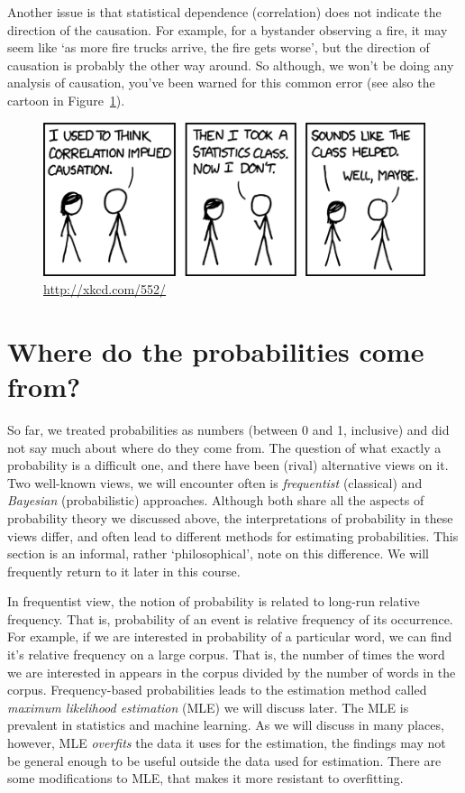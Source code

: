 Another issue is that statistical dependence (correlation)
does not indicate the direction of the causation.
For example,
for a bystander observing a fire,
it may seem like `as more fire trucks arrive, the fire gets worse',
but the direction of causation is probably the other way around.
So although,
we won't be doing any analysis of causation,
you've been warned for this common error
(see also the cartoon in Figure~\ref{fig:xkcd-correlation}).
\begin{figure}
  \includegraphics[width=\linewidth]{figures/xkcd-correlation}
  \caption{\url{http://xkcd.com/552/}}\label{fig:xkcd-correlation}%
\end{figure}



\section{Where do the probabilities come from?}

So far,
we treated probabilities as numbers (between 0 and 1, inclusive)
and did not say much about where do they come from.
The question of what exactly a probability is a difficult one, 
and there have been (rival) alternative views on it.
Two well-known views,
we will encounter often is \emph{frequentist} (classical)
and \emph{Bayesian} (probabilistic) approaches.
Although both share all the aspects of probability theory we discussed above,
the interpretations of probability in these views differ,
and often lead to different methods for estimating probabilities.
This section is an informal, rather `philosophical', note on this difference.
We will frequently return to it later in this course.

In frequentist view,
the notion of probability is related to long-run relative frequency.
That is,
probability of an event is relative frequency of its occurrence.
For example,
if we are interested in probability of a particular word,
we can find it's relative frequency on a large corpus.
That is,
the number of times the word we are interested in appears in the corpus
divided by the number of words in the corpus.
Frequency-based probabilities leads to the estimation method called
\emph{maximum likelihood estimation} (MLE) we will discuss later.
The MLE is prevalent in statistics and machine learning.
As we will discuss in many places, however,
MLE \emph{overfits} the data it uses for the estimation,
the findings may not be general enough to be useful
outside the data used for estimation.
There are some modifications to MLE,
that makes it more resistant to overfitting.

